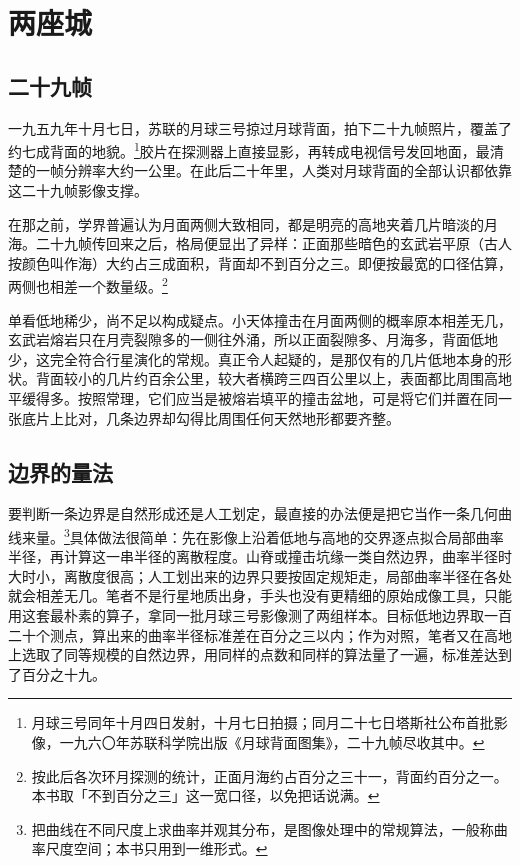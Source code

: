 \chapter{两座城}


\section{二十九帧}

一九五九年十月七日，苏联的月球三号掠过月球背面，拍下二十九帧照片，覆盖了约七成背面的地貌。\footnote{月球三号同年十月四日发射，十月七日拍摄；同月二十七日塔斯社公布首批影像，一九六〇年苏联科学院出版《月球背面图集》，二十九帧尽收其中。}胶片在探测器上直接显影，再转成电视信号发回地面，最清楚的一帧分辨率大约一公里。在此后二十年里，人类对月球背面的全部认识都依靠这二十九帧影像支撑。

在那之前，学界普遍认为月面两侧大致相同，都是明亮的高地夹着几片暗淡的月海。二十九帧传回来之后，格局便显出了异样：正面那些暗色的玄武岩平原（古人按颜色叫作海）大约占三成面积，背面却不到百分之三。即便按最宽的口径估算，两侧也相差一个数量级。\footnote{按此后各次环月探测的统计，正面月海约占百分之三十一，背面约百分之一。本书取「不到百分之三」这一宽口径，以免把话说满。}

单看低地稀少，尚不足以构成疑点。小天体撞击在月面两侧的概率原本相差无几，玄武岩熔岩只在月壳裂隙多的一侧往外涌，所以正面裂隙多、月海多，背面低地少，这完全符合行星演化的常规。真正令人起疑的，是那仅有的几片低地本身的形状。背面较小的几片约百余公里，较大者横跨三四百公里以上，表面都比周围高地平缓得多。按照常理，它们应当是被熔岩填平的撞击盆地，可是将它们并置在同一张底片上比对，几条边界却勾得比周围任何天然地形都要齐整。

\section{边界的量法}

要判断一条边界是自然形成还是人工划定，最直接的办法便是把它当作一条几何曲线来量。\footnote{把曲线在不同尺度上求曲率并观其分布，是图像处理中的常规算法，一般称曲率尺度空间；本书只用到一维形式。}具体做法很简单：先在影像上沿着低地与高地的交界逐点拟合局部曲率半径，再计算这一串半径的离散程度。山脊或撞击坑缘一类自然边界，曲率半径时大时小，离散度很高；人工划出来的边界只要按固定规矩走，局部曲率半径在各处就会相差无几。笔者不是行星地质出身，手头也没有更精细的原始成像工具，只能用这套最朴素的算子，拿同一批月球三号影像测了两组样本。目标低地边界取一百二十个测点，算出来的曲率半径标准差在百分之三以内；作为对照，笔者又在高地上选取了同等规模的自然边界，用同样的点数和同样的算法量了一遍，标准差达到了百分之十九。

